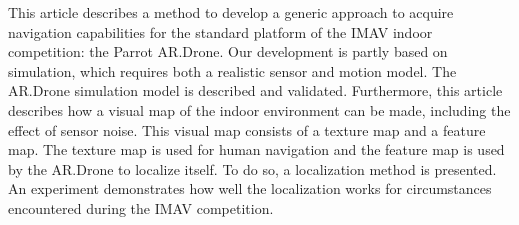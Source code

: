 This article describes a method to develop a generic approach to
acquire navigation capabilities for the standard platform of the IMAV indoor competition: the Parrot AR.Drone.
Our development is partly based on simulation, which requires both a realistic sensor and motion model.
The AR.Drone simulation model is described and validated.
Furthermore, this article describes how a visual map of the indoor environment can be made, including the effect of sensor noise.
This visual map consists of a texture map and a feature map. The texture map is used for human navigation and the feature map is used by the AR.Drone to localize itself.
To do so, a localization method is presented.
An experiment demonstrates how well the localization works for circumstances encountered during the IMAV competition. 
